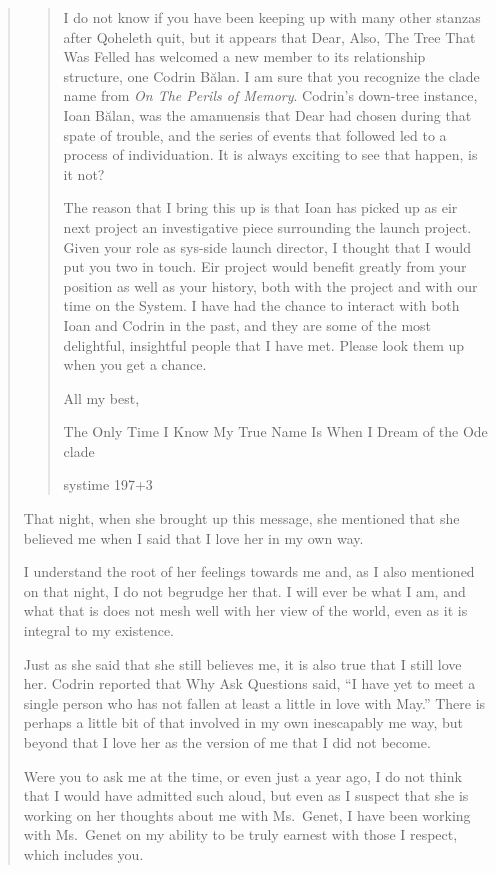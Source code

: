 \begin{quote}
\begin{quote}
I do not know if you have been keeping up with many other stanzas after Qoheleth quit, but it appears that Dear, Also, The Tree That Was Felled has welcomed a new member to its relationship structure, one Codrin Bălan. I am sure that you recognize the clade name from \emph{On The Perils of Memory}. Codrin's down-tree instance, Ioan Bălan, was the amanuensis that Dear had chosen during that spate of trouble, and the series of events that followed led to a process of individuation. It is always exciting to see that happen, is it not?

The reason that I bring this up is that Ioan has picked up as eir next project an investigative piece surrounding the launch project. Given your role as sys-side launch director, I thought that I would put you two in touch. Eir project would benefit greatly from your position as well as your history, both with the project and with our time on the System. I have had the chance to interact with both Ioan and Codrin in the past, and they are some of the most delightful, insightful people that I have met. Please look them up when you get a chance.

All my best,

The Only Time I Know My True Name Is When I Dream of the Ode clade

systime 197+3
\end{quote}

That night, when she brought up this message, she mentioned that she believed me when I said that I love her in my own way.

I understand the root of her feelings towards me and, as I also mentioned on that night, I do not begrudge her that. I will ever be what I am, and what that is does not mesh well with her view of the world, even as it is integral to my existence.

Just as she said that she still believes me, it is also true that I still love her. Codrin reported that Why Ask Questions said, ``I have yet to meet a single person who has not fallen at least a little in love with May.'' There is perhaps a little bit of that involved in my own inescapably me way, but beyond that I love her as the version of me that I did not become.

Were you to ask me at the time, or even just a year ago, I do not think that I would have admitted such aloud, but even as I suspect that she is working on her thoughts about me with Ms.~Genet, I have been working with Ms.~Genet on my ability to be truly earnest with those I respect, which includes you.


\end{quote}

